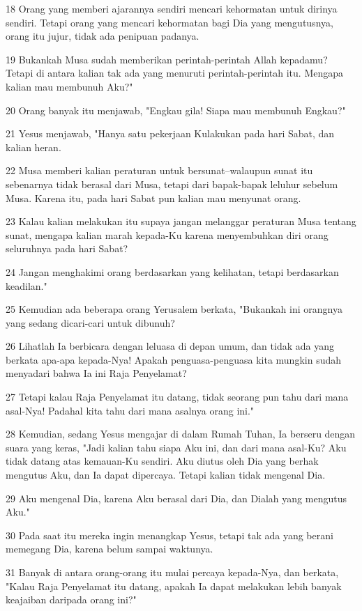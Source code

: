 \par 18 Orang yang memberi ajarannya sendiri mencari kehormatan untuk dirinya sendiri. Tetapi orang yang mencari kehormatan bagi Dia yang mengutusnya, orang itu jujur, tidak ada penipuan padanya.
\par 19 Bukankah Musa sudah memberikan perintah-perintah Allah kepadamu? Tetapi di antara kalian tak ada yang menuruti perintah-perintah itu. Mengapa kalian mau membunuh Aku?"
\par 20 Orang banyak itu menjawab, "Engkau gila! Siapa mau membunuh Engkau?"
\par 21 Yesus menjawab, "Hanya satu pekerjaan Kulakukan pada hari Sabat, dan kalian heran.
\par 22 Musa memberi kalian peraturan untuk bersunat--walaupun sunat itu sebenarnya tidak berasal dari Musa, tetapi dari bapak-bapak leluhur sebelum Musa. Karena itu, pada hari Sabat pun kalian mau menyunat orang.
\par 23 Kalau kalian melakukan itu supaya jangan melanggar peraturan Musa tentang sunat, mengapa kalian marah kepada-Ku karena menyembuhkan diri orang seluruhnya pada hari Sabat?
\par 24 Jangan menghakimi orang berdasarkan yang kelihatan, tetapi berdasarkan keadilan."
\par 25 Kemudian ada beberapa orang Yerusalem berkata, "Bukankah ini orangnya yang sedang dicari-cari untuk dibunuh?
\par 26 Lihatlah Ia berbicara dengan leluasa di depan umum, dan tidak ada yang berkata apa-apa kepada-Nya! Apakah penguasa-penguasa kita mungkin sudah menyadari bahwa Ia ini Raja Penyelamat?
\par 27 Tetapi kalau Raja Penyelamat itu datang, tidak seorang pun tahu dari mana asal-Nya! Padahal kita tahu dari mana asalnya orang ini."
\par 28 Kemudian, sedang Yesus mengajar di dalam Rumah Tuhan, Ia berseru dengan suara yang keras, "Jadi kalian tahu siapa Aku ini, dan dari mana asal-Ku? Aku tidak datang atas kemauan-Ku sendiri. Aku diutus oleh Dia yang berhak mengutus Aku, dan Ia dapat dipercaya. Tetapi kalian tidak mengenal Dia.
\par 29 Aku mengenal Dia, karena Aku berasal dari Dia, dan Dialah yang mengutus Aku."
\par 30 Pada saat itu mereka ingin menangkap Yesus, tetapi tak ada yang berani memegang Dia, karena belum sampai waktunya.
\par 31 Banyak di antara orang-orang itu mulai percaya kepada-Nya, dan berkata, "Kalau Raja Penyelamat itu datang, apakah Ia dapat melakukan lebih banyak keajaiban daripada orang ini?"
